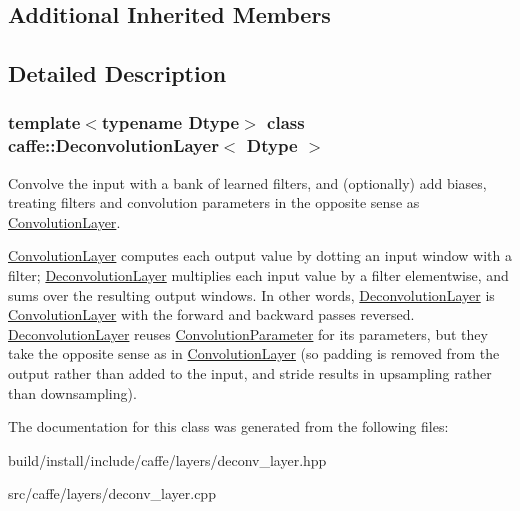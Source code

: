 \subsection*{Additional Inherited Members}


\subsection{Detailed Description}
\subsubsection*{template$<$typename Dtype$>$\newline
class caffe\+::\+Deconvolution\+Layer$<$ Dtype $>$}

Convolve the input with a bank of learned filters, and (optionally) add biases, treating filters and convolution parameters in the opposite sense as \mbox{\hyperlink{classcaffe_1_1_convolution_layer}{Convolution\+Layer}}. 

\mbox{\hyperlink{classcaffe_1_1_convolution_layer}{Convolution\+Layer}} computes each output value by dotting an input window with a filter; \mbox{\hyperlink{classcaffe_1_1_deconvolution_layer}{Deconvolution\+Layer}} multiplies each input value by a filter elementwise, and sums over the resulting output windows. In other words, \mbox{\hyperlink{classcaffe_1_1_deconvolution_layer}{Deconvolution\+Layer}} is \mbox{\hyperlink{classcaffe_1_1_convolution_layer}{Convolution\+Layer}} with the forward and backward passes reversed. \mbox{\hyperlink{classcaffe_1_1_deconvolution_layer}{Deconvolution\+Layer}} reuses \mbox{\hyperlink{classcaffe_1_1_convolution_parameter}{Convolution\+Parameter}} for its parameters, but they take the opposite sense as in \mbox{\hyperlink{classcaffe_1_1_convolution_layer}{Convolution\+Layer}} (so padding is removed from the output rather than added to the input, and stride results in upsampling rather than downsampling). 

The documentation for this class was generated from the following files\+:\begin{DoxyCompactItemize}
\item 
build/install/include/caffe/layers/deconv\+\_\+layer.\+hpp\item 
src/caffe/layers/deconv\+\_\+layer.\+cpp\end{DoxyCompactItemize}
